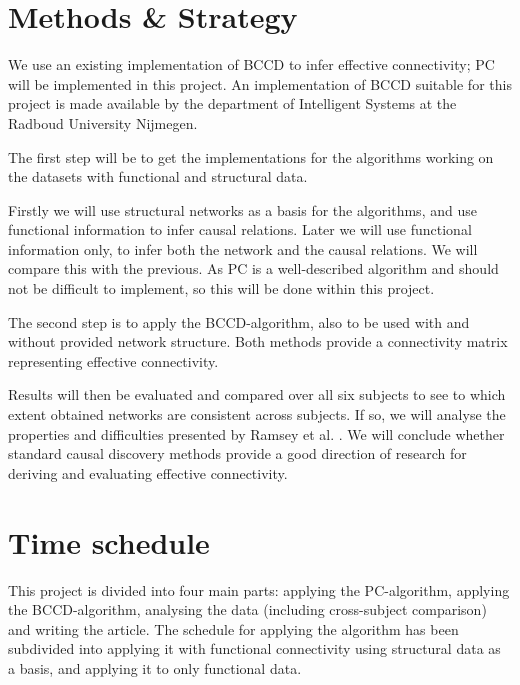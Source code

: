 \documentclass[a4paper, 10pt, english, twocolumn]{article}
\begin{document}
\section{Methods \& Strategy}
We use an existing implementation of BCCD to infer effective connectivity; PC will be implemented in this project.
An implementation of BCCD suitable for this project is made available by the department of Intelligent Systems at the Radboud University Nijmegen.

The first step will be to get the implementations for the algorithms working on the datasets with functional and structural data.

Firstly we will use structural networks as a basis for the algorithms, and use functional information to infer causal relations.
Later we will use functional information only, to infer both the network and the causal relations.
We will compare this with the previous.
As PC is a well-described algorithm \cite{spirtes2000} and should not be difficult to implement, so this will be done within this project.

The second step is to apply the BCCD-algorithm, also to be used with and without provided network structure.
Both methods provide a connectivity matrix representing effective connectivity.

Results will then be evaluated and compared over all six subjects to see to which extent obtained networks are consistent across subjects.
If so, we will analyse the properties and difficulties presented by Ramsey et al. \cite{ramsey2010}.
We will conclude whether standard causal discovery methods provide a good direction of research for deriving and evaluating effective connectivity.


\section{Time schedule}
This project is divided into four main parts: applying the PC-algorithm, applying the BCCD-algorithm, analysing the data (including cross-subject comparison) and writing the article. The schedule for applying the algorithm has been subdivided into applying it with functional connectivity using structural data as a basis, and applying it to only functional data.



{}

\end{document}
